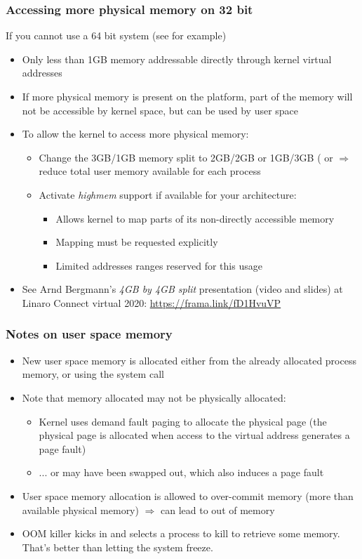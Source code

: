 \begin{frame}
  \frametitle{Accessing more physical memory on 32 bit}
  If you cannot use a 64 bit system (see  for example)
  \begin{itemize}
  \item Only less than 1GB memory addressable directly through kernel virtual addresses
  \item If more physical memory is present on the platform, part of
        the memory will not be accessible by kernel space, but can be used
         by user space
  \item To allow the kernel to access more physical memory:
    \begin{itemize}
    \item Change the 3GB/1GB memory split to 2GB/2GB or 1GB/3GB
          ( or 
          $\Rightarrow$ reduce total user memory available for each process
    \item Activate \emph{highmem} support if available for your
          architecture:
      \begin{itemize}
      \item Allows kernel to map parts of its non-directly accessible
            memory
      \item Mapping must be requested explicitly
      \item Limited addresses ranges reserved for this usage
      \end{itemize}
    \end{itemize}
  \item See Arnd Bergmann's {\em 4GB by 4GB split} presentation (video
        and slides) at Linaro Connect virtual 2020: \url{https://frama.link/fD1HvuVP}
  \end{itemize}
\end{frame}

\begin{frame}
  \frametitle{Notes on user space memory}
  \begin{itemize}
  \item New user space memory is allocated either from the already
    allocated process memory, or using the  system call
  \item Note that memory allocated may not be physically allocated:
    \begin{itemize}
    \item Kernel uses demand fault paging to allocate the physical
      page (the physical page is allocated when access to the virtual
      address generates a page fault)
    \item ... or may have been swapped out, which also induces a page
      fault
    \end{itemize}
  \item User space memory allocation is allowed to over-commit memory
    (more than available physical memory) $\Rightarrow$ can lead to
    out of memory
  \item OOM killer kicks in and selects a process to kill to retrieve
    some memory. That's better than letting the system freeze.
  \end{itemize}
\end{frame}


